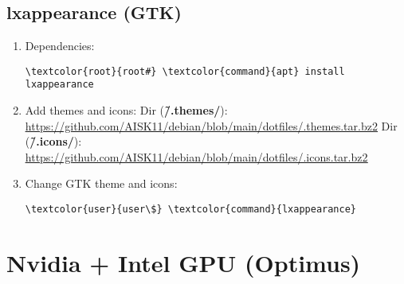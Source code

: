 \documentclass[10pt, a4paper, onecolumn, openany]{book} %
\begin{document}
\section{lxappearance (GTK)}
\begin{enumerate}
    \item Dependencies:
\begin{Verbatim}[commandchars=\\\{\}]
\textcolor{root}{root#} \textcolor{command}{apt} install lxappearance
\end{Verbatim}
    \item Add themes and icons:
\newline Dir (\textbf{\textcolor{dir}{\~/.themes/}}):
\newline \underline{\url{https://github.com/AISK11/debian/blob/main/dotfiles/.themes.tar.bz2}}
\newline Dir (\textbf{\textcolor{dir}{\~/.icons/}}):
\newline \underline{\url{https://github.com/AISK11/debian/blob/main/dotfiles/.icons.tar.bz2}}
    \item Change GTK theme and icons:
\begin{Verbatim}[commandchars=\\\{\}]
\textcolor{user}{user\$} \textcolor{command}{lxappearance}
\end{Verbatim}
\end{enumerate}
\chapter{Nvidia + Intel GPU (Optimus)}
\end{document}
